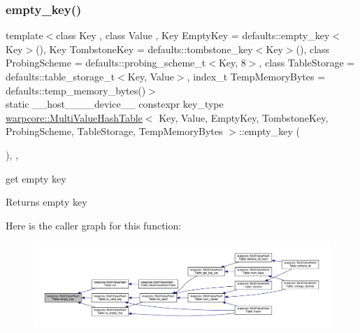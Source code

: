 \subsubsection{\texorpdfstring{empty\+\_\+key()}{empty\_key()}}
{\footnotesize\ttfamily template$<$class Key , class Value , Key Empty\+Key = defaults\+::empty\+\_\+key$<$\+Key$>$(), Key Tombstone\+Key = defaults\+::tombstone\+\_\+key$<$\+Key$>$(), class Probing\+Scheme  = defaults\+::probing\+\_\+scheme\+\_\+t$<$\+Key, 8$>$, class Table\+Storage  = defaults\+::table\+\_\+storage\+\_\+t$<$\+Key, Value$>$, index\+\_\+t Temp\+Memory\+Bytes = defaults\+::temp\+\_\+memory\+\_\+bytes()$>$ \\
static \+\_\+\+\_\+host\+\_\+\+\_\+\+\_\+\+\_\+device\+\_\+\+\_\+ constexpr key\+\_\+type \hyperlink{classwarpcore_1_1MultiValueHashTable}{warpcore\+::\+Multi\+Value\+Hash\+Table}$<$ Key, Value, Empty\+Key, Tombstone\+Key, Probing\+Scheme, Table\+Storage, Temp\+Memory\+Bytes $>$\+::empty\+\_\+key (\begin{DoxyParamCaption}{ }\end{DoxyParamCaption})\hspace{0.3cm}{\ttfamily [inline]}, {\ttfamily [static]}, {\ttfamily [noexcept]}}



get empty key 

\begin{DoxyReturn}{Returns}
empty key 
\end{DoxyReturn}
Here is the caller graph for this function\+:
\nopagebreak
\begin{figure}[H]
\begin{center}
\leavevmode
\includegraphics[width=350pt]{classwarpcore_1_1MultiValueHashTable_a86fffd9e87b2880ccba285614a6238f3_icgraph}
\end{center}
\end{figure}
\mbox{\label{classwarpcore_1_1MultiValueHashTable_a0372f315323a792c0a2924a32ce2c78d}} 
